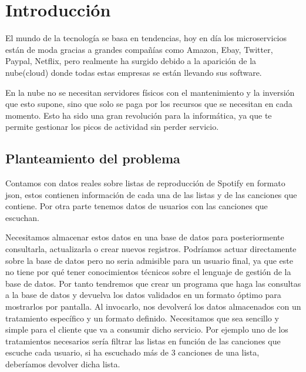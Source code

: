 \documentclass[12pt]{report} %
\begin{document}
\listoffigures
\thispagestyle{fancy}

\newpage %
\thispagestyle{empty}
\mbox{}

\listoftables
\thispagestyle{fancy}

\newpage %
\thispagestyle{empty}
\mbox{}


\clearpage
{} %

\chapter{Introducción}

	El mundo de la tecnología se basa en tendencias, hoy en día los microservicios están de moda gracias a grandes compañías como Amazon, Ebay, Twitter, Paypal, Netflix, pero realmente ha surgido debido a la aparición de la nube(cloud) donde todas estas empresas se están llevando sus software.
	
	En la nube no se necesitan servidores físicos con el mantenimiento y la inversión que esto supone, sino que solo se paga por los recursos que se necesitan en cada momento. Esto ha sido una gran revolución para la informática, ya que te permite gestionar los picos de actividad sin perder servicio.
	
	
	\section{Planteamiento del problema}
	Contamos con datos reales sobre listas de reproducción de Spotify en formato json, estos contienen información de cada una de las listas y de las canciones que contiene.
	Por otra parte tenemos datos de usuarios con las canciones que escuchan.

	Necesitamos almacenar estos datos en una base de datos para posteriormente consultarla, actualizarla o crear nuevos registros. 
	Podríamos actuar directamente sobre la base de datos pero no seria admisible para un usuario final, ya que este no tiene por qué tener conocimientos técnicos sobre el lenguaje de gestión de la base de datos.
	Por tanto tendremos que crear un programa que haga las consultas a la base de datos y devuelva los datos validados en un formato óptimo para mostrarlos por pantalla. Al invocarlo, nos devolverá los datos almacenados con un tratamiento específico y un formato definido. Necesitamos que sea sencillo y simple para el cliente que va a consumir dicho servicio. 
	Por ejemplo uno de los tratamientos necesarios sería filtrar las listas en función de las canciones que escuche cada usuario, si ha escuchado más de 3 canciones de una lista, deberíamos devolver dicha lista.
		
\end{document}
